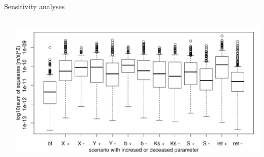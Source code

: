 \begin{block}{Sensitivity analyses}
\begin{columns}
\begin{column}{0.25\textwidth}
    \end{column}
    \begin{column}{0.5\textwidth}
        \includegraphics[width = \textwidth]{obr/sens.png}
    \end{column}
\end{columns}
\end{block}

% 
